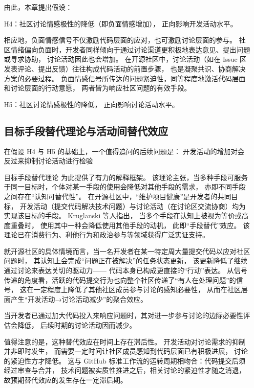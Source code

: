 由此，本章提出假设：

H4：社区讨论情感极性的降低（即负面情感增加），
正向影响开发活动水平。

相应地，负面情感信号不仅激励代码层面的应对，也可激励讨论层面的参与。
社区情绪偏向负面时，开发者同样倾向于通过讨论渠道更积极地表达意见、提出问题或寻求协助，
讨论活动因此也会增加。
在开源社区中，讨论活动（如在 Issue 区发表评论、提出反馈）往往构成代码活动的前置步骤，
也是凝聚共识、协商解决方案的必要过程\cite{guzzi2013}。
负面情感信号所传达的问题紧迫性，同等程度地激活代码层面和讨论层面的行动意愿，
两者皆为响应社区问题的有效手段。

H5：社区讨论情感极性的降低，
正向影响讨论活动水平。

\subsection{目标手段替代理论与活动间替代效应}

在假设 H4 与 H5 的基础上，一个值得追问的后续问题是：
开发活动的增加对会反过来抑制讨论活动进行检验

目标手段替代理论\cite{kruglanski2002theory}
为此提供了有力的解释框架。
该理论主张，当多种手段可服务于同一目标时，个体对某一手段的使用会降低对其他手段的需求，
亦即不同手段之间存在“认知可替代性”。
在开源社区中，“维护项目健康”是开发者的共同目标，
开发活动（提交代码解决技术问题）与讨论活动（在讨论区交流协商）均为实现该目标的手段。
Kruglanski 等人\citeyear{kruglanski2002theory}指出，
当多个手段在认知上被视为等价或高度重叠时，
使用其中一种会降低使用其他手段的动机，
此即“手段替代”效应。
该理论已在消费行为、利他行为和政治参与等领域获得广泛实证支持。

就开源社区的具体情境而言，当一名开发者在某一特定周大量提交代码以应对社区问题时，
其认知上会完成“问题正在被解决”的任务状态更新，
该更新降低了继续通过讨论来表达关切的驱动力——
代码本身已构成更直接的“行动”表达。
从信号传递的角度看，活跃的代码提交行为也向整个社区传递了“有人在处理问题”的信号，
这在一定程度上降低了其他社区成员参与讨论的感知必要性，
从而在社区层面产生“开发活动→讨论活动减少”的聚合效应。

当开发者已通过加大代码投入来响应问题时，其对进一步参与讨论的边际必要性评估会降低，
后续时期的讨论活动因而减少。

值得注意的是，这种替代效应在时间上存在滞后性。
开发活动对讨论需求的抑制并非即时发生，
而需要一定时间让社区成员感知到代码层面已有积极进展，
讨论的紧迫性方才降低。
这与 GitHub 标准工作流的运转周期相吻合：代码提交后须经过审查与合并，
技术问题被实质性推进之后，相关讨论的紧迫性才随之消退，
故预期替代效应的发生存在一定滞后期。

